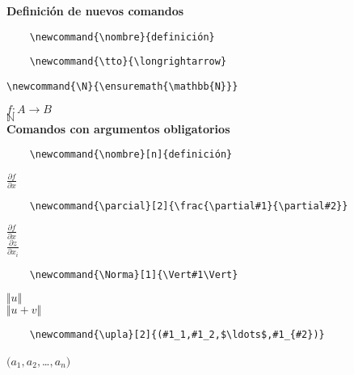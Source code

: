\documentclass[12pt]{book}
\newcommand{\tto}{\longrightarrow}
\newcommand{\N}{\ensuremath{\mathbb{N}}}
\newcommand{\parcial}[2]{\frac{\partial#1}{\partial#2}}
\newcommand{\Norma}[1]{\Vert#1\Vert}
\newcommand{\upla}[2]{(#1_1,#1_2,$\ldots$,#1_{#2})}
\begin{document}
\makeatletter	
\def\@roman#1{\romannumeral#1}
\makeatother
\renewcommand{\baselinestretch}{1.5}%
\renewcommand{\thefootnote}{\arabic{footnote}} %
\renewcommand{\refname}{Referencias bibliográficas}




\noindent\textbf{Definición de nuevos comandos}

\begin{verbatim}
	\newcommand{\nombre}{definición}
\end{verbatim}
\begin{verbatim}
	\newcommand{\tto}{\longrightarrow}
\end{verbatim}
\begin{verbatim}
\newcommand{\N}{\ensuremath{\mathbb{N}}}
\end{verbatim}


$f:A\tto B$\\

\N\\


\vspace{1.5cm}
\noindent\textbf{Comandos con argumentos obligatorios}

\begin{verbatim}
	\newcommand{\nombre}[n]{definición}
\end{verbatim}

$\frac{\partial f}{\partial x}$

\begin{verbatim}
	\newcommand{\parcial}[2]{\frac{\partial#1}{\partial#2}}
\end{verbatim}

$\parcial{f}{x}$\\

$\parcial{z}{x_i}$

\begin{verbatim}
	\newcommand{\Norma}[1]{\Vert#1\Vert}
\end{verbatim}
 
$\Norma{u}$\\

$\Norma{u+v}$

\begin{verbatim}
	\newcommand{\upla}[2]{(#1_1,#1_2,$\ldots$,#1_{#2})}
\end{verbatim}

$\upla{a}{n}$ \\
\end{document}
